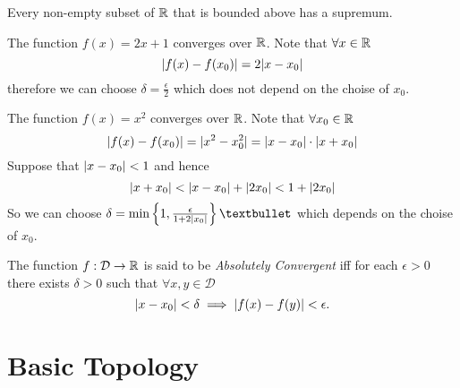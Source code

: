 \begin{axiom}
  Every non-empty subset of $\R$ that is bounded above 
  has a supremum.
\end{axiom}
\newpage
\begin{example}
  The function $f(x)=2x+1$ converges over $\R$.
  Note that $\forall x\in\R$
  \[\lvert f(x)-f(x_0)\rvert=2\lvert x-x_0\rvert\]
  therefore we can choose $\delta=\frac{\epsilon}{2}$
  which does not depend on the choise of $x_0$.
\end{example}
\begin{example}
  The function $f(x)=x^2$ converges over $\R$.
  Note that $\forall x_0\in\R$
  \[\lvert f(x)-f(x_0)\rvert=\lvert x^2-x_0^2\rvert=\lvert x-x_0\rvert\cdot\lvert x+x_0\rvert\]
  Suppose that $\lvert x-x_0\rvert<1$ and hence 
  \[\lvert x+x_0\rvert<\lvert x-x_0\rvert+\lvert2x_0\rvert<1+\lvert2x_0\rvert\]
  So we can choose $\delta=\min\left\{1,\frac{\epsilon}{1+2\abs{x_0}}\right\}•$
  which depends on the choise of $x_0$.
\end{example}
\begin{definition}
  The function $f:\mathcal{D}\to\R$ is said to be \emph{Absolutely Convergent}
  iff for each $\epsilon>0$ there exists $\delta>0$ such 
  that $\forall x,y\in\mathcal{D}$ 
  \[\lvert x-x_0\rvert<\delta\implies\lvert f(x)-f(y)\rvert<\epsilon.\]
\end{definition}

\chapter{Basic Topology}

